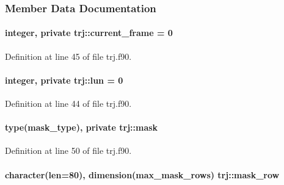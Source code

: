 \subsubsection{Member Data Documentation}
\hypertarget{classtrj_a2b6c4bc77aab36d66d49c40d0eb6bfa3}{
\paragraph[{current\-\_\-frame}]{\setlength{\rightskip}{0pt plus 5cm}integer, private trj\-::current\-\_\-frame = 0\hspace{0.3cm}{\ttfamily [private]}}}\label{classtrj_a2b6c4bc77aab36d66d49c40d0eb6bfa3}


Definition at line 45 of file trj.\-f90.

\hypertarget{classtrj_a0b2ab5229b0662496be10cd030269061}{
\paragraph[{lun}]{\setlength{\rightskip}{0pt plus 5cm}integer, private trj\-::lun = 0\hspace{0.3cm}{\ttfamily [private]}}}\label{classtrj_a0b2ab5229b0662496be10cd030269061}


Definition at line 44 of file trj.\-f90.

\hypertarget{classtrj_ab48e8fc72f4100008d1e4eb7ca8e6101}{
\paragraph[{mask}]{\setlength{\rightskip}{0pt plus 5cm}type(mask\-\_\-type), private trj\-::mask\hspace{0.3cm}{\ttfamily [private]}}}\label{classtrj_ab48e8fc72f4100008d1e4eb7ca8e6101}


Definition at line 50 of file trj.\-f90.

\hypertarget{classtrj_a2e5ed1fb4cc717df7c8a8cd01174d0c1}{
\paragraph[{mask\-\_\-row}]{\setlength{\rightskip}{0pt plus 5cm}character(len=80), dimension({\bf max\-\_\-mask\-\_\-rows}) trj\-::mask\-\_\-row}}\label{classtrj_a2e5ed1fb4cc717df7c8a8cd01174d0c1}


